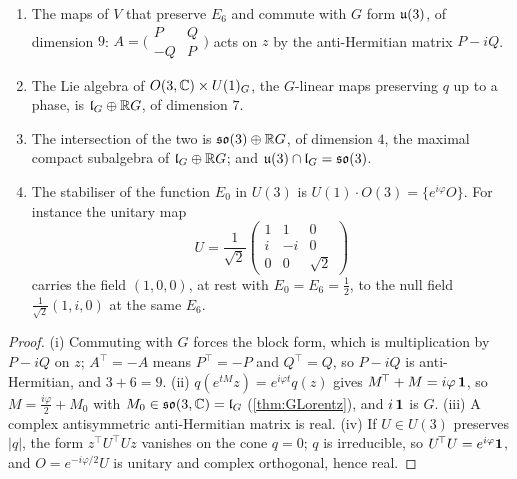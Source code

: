 \begin{proposition}
\label{en:u3}
\begin{enumerate}[label=(\roman*),leftmargin=2.2em]
\item The maps of $V$ that preserve $E_6$ and commute with $G$ form $\mathfrak{u}(3)$, of dimension $9$: $A=\bigl(\begin{smallmatrix}P&Q\\-Q&P\end{smallmatrix}\bigr)$
acts on $z$ by the anti-Hermitian matrix $P-iQ$.
\item The Lie algebra of $O(3,\mathbb{C})\times U(1)_G$, the $G$-linear maps preserving $q$ up to a phase, is $\mathfrak l_G\oplus\mathbb{R} G$, of dimension $7$.
\item The intersection of the two is $\mathfrak{so}(3)\oplus\mathbb{R} G$, of dimension $4$, the maximal compact subalgebra of $\mathfrak l_G\oplus\mathbb{R} G$; and $\mathfrak{u}(3)\cap\mathfrak l_G=\mathfrak{so}(3)$.
\item The stabiliser of the function $E_0$ in $U(3)$ is $U(1)\cdot O(3)=\{e^{i\varphi}O\}$. For instance the unitary map
\[
U=\frac1{\sqrt2}\begin{pmatrix}1&1&0\\ i&-i&0\\ 0&0&\sqrt2\end{pmatrix}
\]
carries the field $(1,0,0)$, at rest with $E_0=E_6=\tfrac12$, to the null field $\tfrac1{\sqrt2}(1,i,0)$ at the same $E_6$.
\end{enumerate}
\end{proposition}

\begin{proof}
(i) Commuting with $G$ forces the block form, which is multiplication by $P-iQ$ on $z$; $A^{\!\top}=-A$ means $P^{\!\top}=-P$ and $Q^{\!\top}=Q$, so
$P-iQ$ is anti-Hermitian, and $3+6=9$. (ii) $q(e^{tM}z)=e^{i\varphi t}q(z)$ gives $M^{\!\top}+M=i\varphi\,\mathbf 1$, so $M=\tfrac{i\varphi}2+M_0$ with
$M_0\in\mathfrak{so}(3,\mathbb{C})=\mathfrak l_G$ (\cref{thm:GLorentz}), and $i\,\mathbf 1$ is $G$. (iii) A complex antisymmetric anti-Hermitian matrix is real. (iv) If $U\in U(3)$
preserves $|q|$, the form $z^{\!\top}U^{\!\top}Uz$ vanishes on the cone $q=0$; $q$ is irreducible, so $U^{\!\top}U=e^{i\varphi}\mathbf 1$, and
$O=e^{-i\varphi/2}U$ is unitary and complex orthogonal, hence real.
\end{proof}

